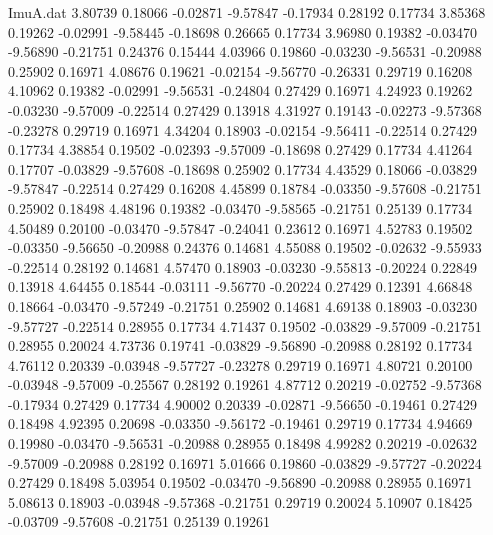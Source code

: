 \begin{filecontents}{ImuA.dat}
   3.80739    0.18066   -0.02871   -9.57847   -0.17934    0.28192    0.17734
   3.85368    0.19262   -0.02991   -9.58445   -0.18698    0.26665    0.17734
   3.96980    0.19382   -0.03470   -9.56890   -0.21751    0.24376    0.15444
   4.03966    0.19860   -0.03230   -9.56531   -0.20988    0.25902    0.16971
   4.08676    0.19621   -0.02154   -9.56770   -0.26331    0.29719    0.16208
   4.10962    0.19382   -0.02991   -9.56531   -0.24804    0.27429    0.16971
   4.24923    0.19262   -0.03230   -9.57009   -0.22514    0.27429    0.13918
   4.31927    0.19143   -0.02273   -9.57368   -0.23278    0.29719    0.16971
   4.34204    0.18903   -0.02154   -9.56411   -0.22514    0.27429    0.17734
   4.38854    0.19502   -0.02393   -9.57009   -0.18698    0.27429    0.17734
   4.41264    0.17707   -0.03829   -9.57608   -0.18698    0.25902    0.17734
   4.43529    0.18066   -0.03829   -9.57847   -0.22514    0.27429    0.16208
   4.45899    0.18784   -0.03350   -9.57608   -0.21751    0.25902    0.18498
   4.48196    0.19382   -0.03470   -9.58565   -0.21751    0.25139    0.17734
   4.50489    0.20100   -0.03470   -9.57847   -0.24041    0.23612    0.16971
   4.52783    0.19502   -0.03350   -9.56650   -0.20988    0.24376    0.14681
   4.55088    0.19502   -0.02632   -9.55933   -0.22514    0.28192    0.14681
   4.57470    0.18903   -0.03230   -9.55813   -0.20224    0.22849    0.13918
   4.64455    0.18544   -0.03111   -9.56770   -0.20224    0.27429    0.12391
   4.66848    0.18664   -0.03470   -9.57249   -0.21751    0.25902    0.14681
   4.69138    0.18903   -0.03230   -9.57727   -0.22514    0.28955    0.17734
   4.71437    0.19502   -0.03829   -9.57009   -0.21751    0.28955    0.20024
   4.73736    0.19741   -0.03829   -9.56890   -0.20988    0.28192    0.17734
   4.76112    0.20339   -0.03948   -9.57727   -0.23278    0.29719    0.16971
   4.80721    0.20100   -0.03948   -9.57009   -0.25567    0.28192    0.19261
   4.87712    0.20219   -0.02752   -9.57368   -0.17934    0.27429    0.17734
   4.90002    0.20339   -0.02871   -9.56650   -0.19461    0.27429    0.18498
   4.92395    0.20698   -0.03350   -9.56172   -0.19461    0.29719    0.17734
   4.94669    0.19980   -0.03470   -9.56531   -0.20988    0.28955    0.18498
   4.99282    0.20219   -0.02632   -9.57009   -0.20988    0.28192    0.16971
   5.01666    0.19860   -0.03829   -9.57727   -0.20224    0.27429    0.18498
   5.03954    0.19502   -0.03470   -9.56890   -0.20988    0.28955    0.16971
   5.08613    0.18903   -0.03948   -9.57368   -0.21751    0.29719    0.20024
   5.10907    0.18425   -0.03709   -9.57608   -0.21751    0.25139    0.19261

\end{filecontents}
